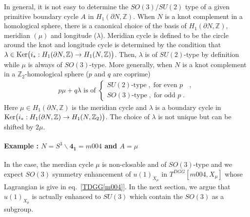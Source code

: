 \documentclass[a4paper,11pt]{article}
\begin{document}
In general, it is not easy to determine the $SO(3)/SU(2)$ type of a given primitive boundary cycle $A$ in $H_{1}(\partial N, \mathbb{Z})$. When $N$ is a knot complement in a homological sphere, there is a canonical choice of the basis of $H_{1}(\partial N, \mathbb{Z})$, meridian $(\mu)$ and longitude ($\lambda$). Meridian cycle is defined to be the circle around the knot and longitude cycle is determined by the condition that $\lambda \in \textrm{Ker}\big{(}i_* : H_1 (\partial N, \mathbb{Z}) \rightarrow H_1 (N, \mathbb{Z})\big{)}$.  Then, $\lambda$ is of $SU(2)$-type by definition while $\mu$ is  always of $SO(3)$-type.  More generally, when $N$ is a knot complement in a $\mathbb{Z}_2$-homological sphere ($p$ and $q$ are coprime)
%
\begin{align}
p\mu+q \lambda \textrm{ is of }
 \begin{cases}
 \textrm{$SU(2)$-type}\;,\; \textrm{for even $p$ }\;,
 \\
\textrm{$SO(3)$-type}\;,\;\textrm{for odd $p$}\;. \label{SO(3)/SU(3) type in Z2-homology sphere}
\end{cases} 
\end{align}
%
Here $\mu\in H_1 (\partial N, \mathbb{Z})$ is the meridian cycle and  $\lambda$ is a boundary cycle  in $ \textrm{Ker}\big{(}i_* : H_1 (\partial N, \mathbb{Z}) \rightarrow H_1 (N, \mathbb{Z}_2)\big{)}$.  The choice of $\lambda$ is not unique but can be shifted by $2\mu$. 


\paragraph{Example : $N=S^3\backslash \mathbf{4_1}= m004$ and $A =\mu$} In the case, the merdian cycle $\mu$ is non-closable and of $SO(3)$-type and we expect  $SO(3)$ symmetry enhancement of $u(1)_{X_{\mu}}$ in $T^{DGG}[m004, X_{\mu}]$ whose Lagrangian is give in eq.~\eqref{TDGG[m004]}. In the next section, we  argue that $u(1)_{X_\mu}$ is actually enhanced to $SU(3)$ which contain the $SO(3)$ as a subgroup. 
\end{document}
